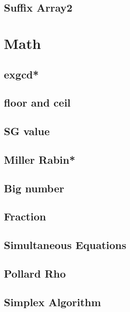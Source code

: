 \subsection{Suffix Array2}



\section{Math}
\subsection{exgcd*} %

\subsection{floor and ceil}

\subsection{SG value}

% 
\subsection{Miller Rabin*} %

\subsection{Big number}

\subsection{Fraction}

\subsection{Simultaneous Equations}

\subsection{Pollard Rho}

\subsection{Simplex Algorithm}

